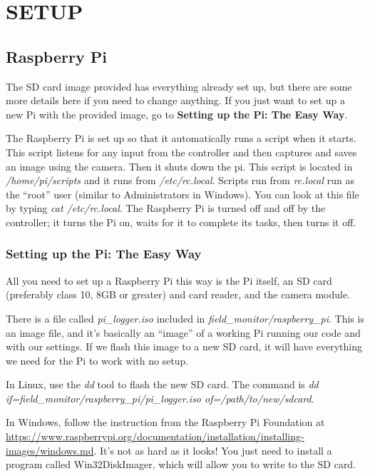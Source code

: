 \documentclass[10pt]{article}
\begin{document}
\section{SETUP}

\subsection{Raspberry Pi}
The SD card image provided has everything already set up, but there are some more details here if you need to change anything. If you just want to set up a new Pi with the
provided image, go to \textbf{Setting up the Pi: The Easy Way}.

The Raspberry Pi is set up so that it automatically runs a script when it starts. This script listens for any input from the controller and then captures and saves an image
using the camera. Then it shuts down the pi. This script is located in \textit{/home/pi/scripts} and it runs from \textit{/etc/rc.local}. Scripts run from \textit{rc.local}
run as the ``root'' user (similar to Administrators in Windows). You can look at this file by typing \textit{cat /etc/rc.local}. The Raspberry Pi is turned off and off
by the controller; it turns the Pi on, waits for it to complete its tasks, then turns it off.

\subsubsection{Setting up the Pi: The Easy Way}
All you need to set up a Raspberry Pi this way is the Pi itself, an SD card (preferably class 10, 8GB or greater) and card reader, and the camera module.

There is a file called \textit{pi\_logger.iso} included in \textit{field\_monitor/raspberry\_pi}. This is an image file, and it's basically an ``image'' of a working Pi
running our code and with our settings. If we flash this image to a new SD card, it will have everything we need for the Pi to work with no setup. 

In Linux, use the \textit{dd} tool to flash the new SD card. The command is \textit{dd if=field\_monitor/raspberry\_pi/pi\_logger.iso of=/path/to/new/sdcard}. 

In Windows, follow the instruction from the Raspberry Pi Foundation at \url{https://www.raspberrypi.org/documentation/installation/installing-images/windows.md}. It's
not as hard as it looks! You just need to install a program called Win32DiskImager, which will allow you to write to the SD card.
\end{document}
